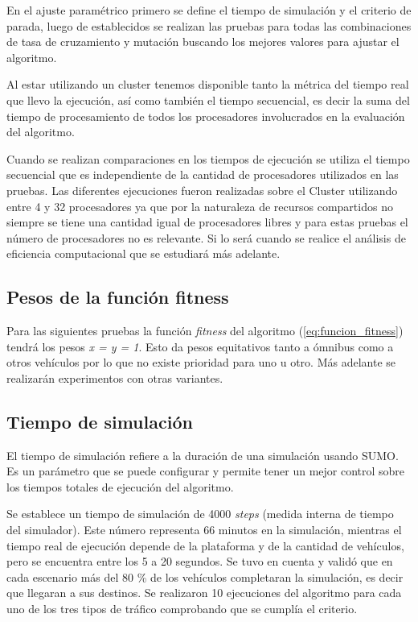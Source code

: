 En el ajuste paramétrico primero se define el tiempo de simulación y el criterio de parada, luego de establecidos se realizan las pruebas para todas las combinaciones de tasa de cruzamiento y mutación buscando los mejores valores para ajustar el algoritmo.

Al estar utilizando un cluster tenemos disponible tanto la métrica del tiempo real que llevo la ejecución, así como también el tiempo secuencial, es decir la suma del tiempo de procesamiento de todos los procesadores involucrados en la evaluación del algoritmo. 

Cuando se realizan comparaciones en los tiempos de ejecución se utiliza el tiempo secuencial que es independiente de la cantidad de procesadores utilizados en las pruebas. Las diferentes ejecuciones fueron realizadas sobre el Cluster utilizando entre 4 y 32 procesadores ya que por la naturaleza de recursos compartidos no siempre se tiene una cantidad igual  de procesadores libres y para estas pruebas el número de procesadores no es relevante. Si lo será cuando se realice el análisis de eficiencia computacional que se estudiará más adelante.



\subsection{Pesos de la función fitness}

Para las siguientes pruebas la función \emph{fitness} del algoritmo (\ref{eq:funcion_fitness}) tendrá los pesos \emph{x = y = 1}. Esto da pesos equitativos tanto a ómnibus como a otros vehículos por lo que no existe prioridad para uno u otro. Más adelante se realizarán experimentos con otras variantes.


\subsection{Tiempo de simulación}
El tiempo de simulación refiere a la duración de una simulación usando SUMO. Es un parámetro que se puede configurar y permite tener un mejor control sobre los tiempos totales de ejecución del algoritmo.

Se establece un tiempo de simulación de 4000 \emph{steps} (medida interna de tiempo del simulador). Este número representa 66 minutos en la simulación, mientras el tiempo real de ejecución depende de la plataforma y de la cantidad de vehículos, pero se encuentra entre los 5 a 20 segundos. Se tuvo en cuenta y validó que en cada escenario más del 80 \% de los vehículos completaran la simulación, es decir que llegaran a sus destinos. Se realizaron 10 ejecuciones del algoritmo para cada uno de los tres tipos de tráfico comprobando que se cumplía el criterio.


